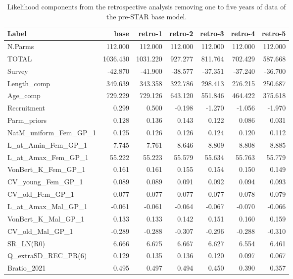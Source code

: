 \documentclass[
  english,
  a4paper,
]{article}
\begin{document}
\begin{landscape}\begin{table}

\caption{\label{tab:retro}Likelihood components from the retrospective analysis removing one to five years of data of the pre-STAR base model.}
\centering
\begin{tabular}[t]{lrrrrrr}
\toprule
Label & base & retro-1 & retro-2 & retro-3 & retro-4 & retro-5\\
\midrule
N.Parms & 112.000 & 112.000 & 112.000 & 112.000 & 112.000 & 112.000\\
TOTAL & 1036.430 & 1031.220 & 927.277 & 811.764 & 702.429 & 587.668\\
Survey & -42.870 & -41.900 & -38.577 & -37.351 & -37.240 & -36.700\\
Length\_comp & 349.639 & 343.358 & 322.786 & 298.413 & 276.215 & 250.687\\
Age\_comp & 729.229 & 729.126 & 643.120 & 551.846 & 464.422 & 375.618\\
Recruitment & 0.299 & 0.500 & -0.198 & -1.270 & -1.056 & -1.970\\
Parm\_priors & 0.128 & 0.136 & 0.143 & 0.122 & 0.086 & 0.031\\
NatM\_uniform\_Fem\_GP\_1 & 0.125 & 0.126 & 0.126 & 0.124 & 0.120 & 0.112\\
L\_at\_Amin\_Fem\_GP\_1 & 7.745 & 7.761 & 8.646 & 8.809 & 8.808 & 8.885\\
L\_at\_Amax\_Fem\_GP\_1 & 55.222 & 55.223 & 55.579 & 55.634 & 55.763 & 55.779\\
VonBert\_K\_Fem\_GP\_1 & 0.161 & 0.161 & 0.155 & 0.154 & 0.150 & 0.149\\
CV\_young\_Fem\_GP\_1 & 0.089 & 0.089 & 0.091 & 0.092 & 0.094 & 0.093\\
CV\_old\_Fem\_GP\_1 & 0.077 & 0.077 & 0.077 & 0.077 & 0.078 & 0.079\\
L\_at\_Amax\_Mal\_GP\_1 & -0.061 & -0.061 & -0.064 & -0.067 & -0.070 & -0.066\\
VonBert\_K\_Mal\_GP\_1 & 0.133 & 0.133 & 0.142 & 0.151 & 0.160 & 0.159\\
CV\_old\_Mal\_GP\_1 & -0.289 & -0.288 & -0.307 & -0.296 & -0.288 & -0.310\\
SR\_LN(R0) & 6.666 & 6.675 & 6.667 & 6.627 & 6.554 & 6.461\\
Q\_extraSD\_REC\_PR(6) & 0.129 & 0.135 & 0.136 & 0.120 & 0.097 & 0.067\\
Bratio\_2021 & 0.495 & 0.497 & 0.494 & 0.450 & 0.390 & 0.357\\

\end{tabular}
\end{table}
\end{landscape}
\end{document}
